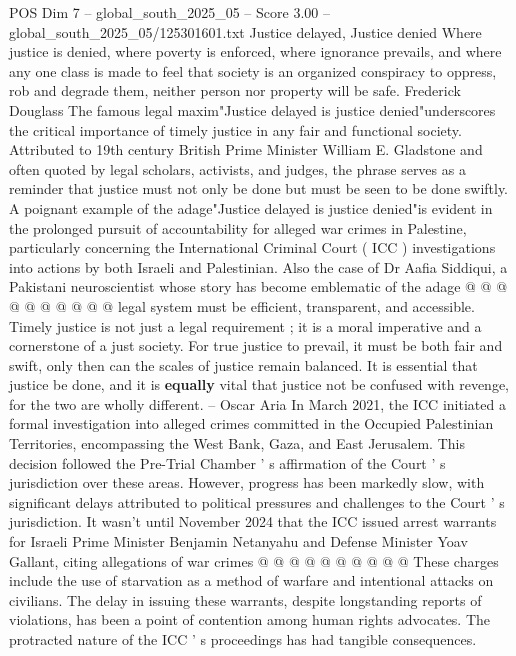 \begin{textsample}{POS Dim 7 – global\_south\_2025\_05 – Score 3.00 – global\_south\_2025\_05/125301601.txt}  \label{ex:f7_pos_443}
Justice delayed, Justice denied Where justice is denied, where poverty is enforced, where ignorance prevails, and where any one class is made to feel that society is an organized conspiracy to oppress, rob and degrade them, neither person nor property will be safe.
Frederick Douglass The famous legal maxim"Justice delayed is justice denied"underscores the critical importance of timely justice in any fair and functional society.
Attributed to 19th century British Prime Minister William E.
Gladstone and often quoted by legal scholars, activists, and judges, the phrase serves as a reminder that justice must not only be done but must be seen to be done swiftly.
A poignant example of the adage"Justice delayed is justice denied"is evident in the prolonged pursuit of accountability for alleged war crimes in Palestine, particularly concerning the International Criminal Court ( ICC ) investigations into actions by both Israeli and Palestinian.
Also the case of Dr Aafia Siddiqui, a Pakistani neuroscientist whose story has become emblematic of the adage @ @ @ @ @ @ @ @ @ @ legal system must be efficient, transparent, and accessible.
Timely justice is not just a legal requirement ; it is a moral imperative and a cornerstone of a just society.
For true justice to prevail, it must be both fair and swift, only then can the scales of justice remain balanced.
It is essential that justice be done, and it is \textbf{equally} vital that justice not be confused with revenge, for the two are wholly different. -- Oscar Aria In March 2021, the ICC initiated a formal investigation into alleged crimes committed in the Occupied Palestinian Territories, encompassing the West Bank, Gaza, and East Jerusalem.
This decision followed the Pre-Trial Chamber ' s affirmation of the Court ' s jurisdiction over these areas.
However, progress has been markedly slow, with significant delays attributed to political pressures and challenges to the Court ' s jurisdiction.
It wasn't until November 2024 that the ICC issued arrest warrants for Israeli Prime Minister Benjamin Netanyahu and Defense Minister Yoav Gallant, citing allegations of war crimes @ @ @ @ @ @ @ @ @ @ These charges include the use of starvation as a method of warfare and intentional attacks on civilians.
The delay in issuing these warrants, despite longstanding reports of violations, has been a point of contention among human rights advocates.
The protracted nature of the ICC ' s proceedings has had tangible consequences.

\end{textsample}

